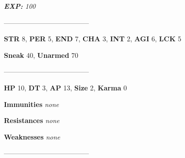 \documentclass[11pt,a4paper,twocolumn]{book}
\begin{document}
	\emph{\textbf{EXP:} 100}
	
%		
%	
%		

	--------------------------------------

	\noindent
	\textbf{STR} 8, \textbf{PER} 5, \textbf{END} 7, \textbf{CHA} 3, \textbf{INT} 2, \textbf{AGI} 6, \textbf{LCK} 5
	
	\noindent
	\textbf{Sneak} 40, \textbf{Unarmed} 70
	
	--------------------------------------
	
	\noindent
	\textbf{HP} 10, \textbf{DT} 3, \textbf{AP} 13, \textbf{Size} 2, \textbf{Karma} 0
	
	
	\noindent
	\textbf{Immunities} \emph{none} %
	
	\noindent
	\textbf{Resistances} \emph{none} %
	
	\noindent
	\textbf{Weaknesses} \emph{none} %
	
	--------------------------------------
	
\end{document}
